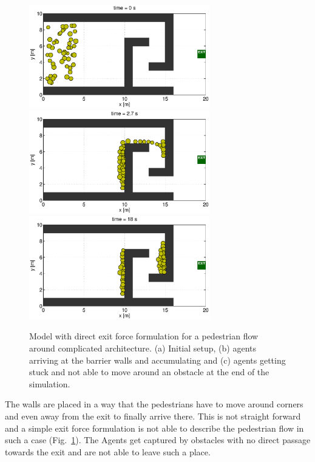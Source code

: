 \documentclass[11pt]{article}
\begin{document}
\begin{figure}
	\begin{center}
	\includegraphics[width=0.7\textwidth]
	{figures/Model2_direct_1_000000.eps}
	\qquad
	\includegraphics[width=0.7\textwidth]
	{figures/Model2_direct_1_000270.eps}
	\qquad
	\includegraphics[width=0.7\textwidth]
	{figures/Model2_direct_1_001800.eps}
	\caption{Model with direct exit force formulation for a pedestrian flow around complicated architecture. (a) Initial setup, (b) agents arriving at the barrier walls and accumulating and (c) agents getting stuck and not able to move around an obstacle at the end of the simulation.}
	\label{fig:simple3}
	\end{center}
\end{figure}

The walls are placed in a way that the pedestrians have to move around corners and even away from the exit to finally arrive there. This is not straight forward and a simple exit force formulation is not able to describe the pedestrian flow in such a case (Fig.~\ref{fig:simple3}). The Agents get captured by obstacles with no direct passage towards the exit and are not able to leave such a place. 
\end{document}
